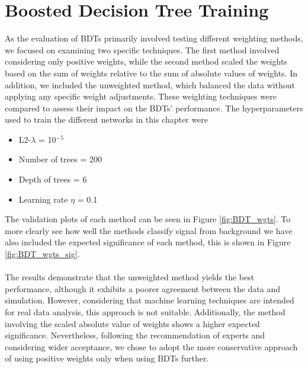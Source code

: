 \documentclass[12pt, a4paper]{book}
\begin{document}
\section{Boosted Decision Tree Training}
As the evaluation of BDTs primarily involved testing different weighting methods, we focused on examining two specific techniques. The first method involved considering only positive weights, while the second method scaled the weights based on the sum of weights relative to the sum of absolute values of weights. 
In addition, we included the unweighted method, which balanced the data without applying any specific weight adjustments. These weighting techniques were compared to assess their impact on the BDTs' performance. The hyperparameters used to train the different networks in this chapter were
\begin{itemize}
   \item L2-$\lambda$ = 10$^{-5}$
   \item Number of trees = 200
   \item Depth of trees = 6
   \item Learning rate $\eta$ = 0.1
\end{itemize}
The validation plots of each method can be seen in Figure \ref{fig:BDT_wgts}. To more clearly see how well the methods classify signal from background we have also included the expected significance of each method, this is shown in Figure \ref{fig:BDT_wgts_sig}.\\
\\The results demonstrate that the unweighted method yields the best performance, although it exhibits a poorer agreement between the data and simulation. However, considering that machine learning techniques are intended for real data analysis, this approach is not suitable. 
Additionally, the method involving the scaled absolute value of weights shows a higher expected significance. Nevertheless, following the recommendation of experts and considering wider acceptance, we chose to adopt the more conservative approach of using positive weights only when using BDTs further.
\graphicspath{{../../Plots/XGBoost/Weighting_methods/}}
\end{document}
